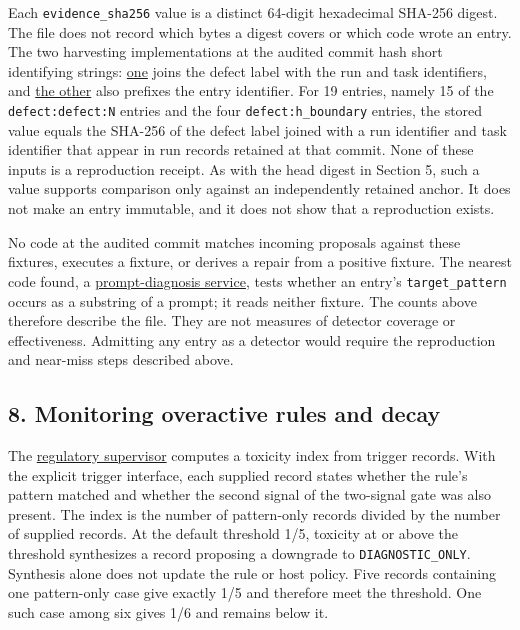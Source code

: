 \documentclass[
  11pt,
]{article}
\newcommand{\passthrough}[1]{#1}
\begin{document}
Each \texttt{\nolinkurl{evidence_sha256}} value is a distinct
64-digit hexadecimal SHA-256 digest. The file does not record which
bytes a digest covers or which code wrote an entry. The two harvesting
implementations at the audited commit hash short identifying strings:
\href{https://github.com/dbccpage/the_symbol_game/blob/52cb5457f6c485ba548cfd292f6012a941ed22cf/moscow/domain/immune/seeder.py}{one}
joins the defect label with the run and task identifiers, and
\href{https://github.com/dbccpage/the_symbol_game/blob/52cb5457f6c485ba548cfd292f6012a941ed22cf/operations/domain/symbol_game_bridge/pharmacy_seeder.py}{the
other} also prefixes the entry identifier. For 19 entries, namely 15 of
the \passthrough{\lstinline!defect:defect:N!} entries and the four
\texttt{\nolinkurl{defect:h_boundary}} entries, the stored value
equals the SHA-256 of the defect label joined with a run identifier and
task identifier that appear in run records retained at that commit. None
of these inputs is a reproduction receipt. As with the head digest in
Section 5, such a value supports comparison only against an
independently retained anchor. It does not make an entry immutable, and
it does not show that a reproduction exists.

No code at the audited commit matches incoming proposals against these
fixtures, executes a fixture, or derives a repair from a positive
fixture. The nearest code found, a
\href{https://github.com/dbccpage/the_symbol_game/blob/52cb5457f6c485ba548cfd292f6012a941ed22cf/external_application/prompt_doctor/use_cases/repair_service.py}{prompt-diagnosis
service}, tests whether an entry's
\texttt{\nolinkurl{target_pattern}} occurs as a substring of a
prompt; it reads neither fixture. The counts above therefore describe
the file. They are not measures of detector coverage or effectiveness.
Admitting any entry as a detector would require the reproduction and
near-miss steps described above.

\hypertarget{monitoring-overactive-rules-and-decay}{%
\subsection{8. Monitoring overactive rules and
decay}\label{monitoring-overactive-rules-and-decay}}

The
\href{https://github.com/dbccpage/the_symbol_game/blob/52cb5457f6c485ba548cfd292f6012a941ed22cf/symbol_game/domain/immune/treg.py}{regulatory
supervisor} computes a toxicity index from trigger records. With the
explicit trigger interface, each supplied record states whether the
rule's pattern matched and whether the second signal of the two-signal
gate was also present. The index is the number of pattern-only records
divided by the number of supplied records. At the default threshold 1/5,
toxicity at or above the threshold synthesizes a record proposing a
downgrade to \texttt{\nolinkurl{DIAGNOSTIC_ONLY}}. Synthesis alone
does not update the rule or host policy. Five records containing one
pattern-only case give exactly 1/5 and therefore meet the threshold. One
such case among six gives 1/6 and remains below it.
\end{document}
